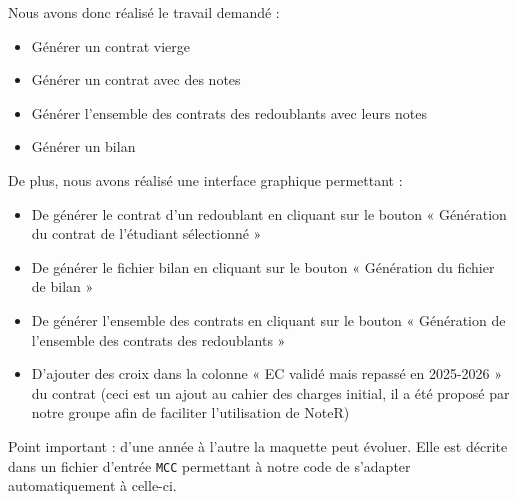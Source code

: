 Nous avons donc réalisé le travail demandé :
\begin{itemize}
    \item Générer un contrat vierge
    \item Générer un contrat avec des notes
    \item Générer l'ensemble des contrats des redoublants avec leurs notes
    \item Générer un bilan
\end{itemize}


\noindent De plus, nous avons réalisé une interface graphique permettant : 
\begin{itemize}
  \item De générer le contrat d'un redoublant en cliquant sur le bouton « Génération du contrat de l'étudiant sélectionné »
  \item De générer le fichier bilan en cliquant sur le bouton « Génération du fichier de bilan »
  \item De générer l'ensemble des contrats en cliquant sur le bouton « Génération de l'ensemble des contrats des redoublants »
  \item D'ajouter des croix dans la colonne « EC validé mais repassé en 2025-2026 » du contrat (ceci est un ajout au cahier des charges initial, il a été proposé par notre groupe afin de faciliter l'utilisation de NoteR)
\end{itemize}

Point important : d'une année à l'autre la maquette peut évoluer. Elle est décrite dans un fichier d'entrée \texttt{MCC} permettant à notre code de s'adapter automatiquement à celle-ci.
